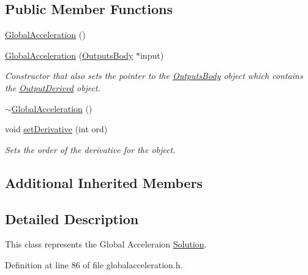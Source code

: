 \subsection*{Public Member Functions}
\begin{DoxyCompactItemize}
\item 
\hyperlink{classosea_1_1ofreq_1_1_global_acceleration_a37a05fcecd06641847388428a3f43fb8}{Global\-Acceleration} ()
\item 
\hyperlink{classosea_1_1ofreq_1_1_global_acceleration_acf5cd2816897a20982767248ae88ed07}{Global\-Acceleration} (\hyperlink{classosea_1_1ofreq_1_1_outputs_body}{Outputs\-Body} $\ast$input)
\begin{DoxyCompactList}\small\item\em Constructor that also sets the pointer to the \hyperlink{classosea_1_1ofreq_1_1_outputs_body}{Outputs\-Body} object which contains the \hyperlink{classosea_1_1ofreq_1_1_output_derived}{Output\-Derived} object. \end{DoxyCompactList}\item 
\hyperlink{classosea_1_1ofreq_1_1_global_acceleration_aafb7853a1923f0e06b96f2ef4eca03d3}{$\sim$\-Global\-Acceleration} ()
\item 
void \hyperlink{classosea_1_1ofreq_1_1_global_acceleration_a14a041ea42d4c1bc10211c9a44aa3431}{set\-Derivative} (int ord)
\begin{DoxyCompactList}\small\item\em Sets the order of the derivative for the object. \end{DoxyCompactList}\end{DoxyCompactItemize}
\subsection*{Additional Inherited Members}


\subsection{Detailed Description}
This class represents the Global Acceleraion \hyperlink{classosea_1_1ofreq_1_1_solution}{Solution}. 

Definition at line 86 of file globalacceleration.\-h.




